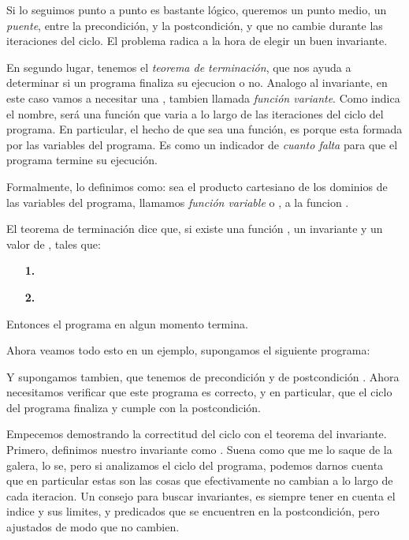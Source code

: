 \documentclass{article}
\begin{document}
Si lo seguimos punto a punto es bastante lógico, queremos un punto medio, un \textit{puente}, entre la precondición, y la postcondición, y que no cambie durante las iteraciones del ciclo. El problema radica a la hora de elegir un buen invariante.

En segundo lugar, tenemos el \textit{teorema de terminación}, que nos ayuda a determinar si un programa finaliza su ejecucion o no. Analogo al invariante, en este caso vamos a necesitar una , tambien llamada \textit{función variante}. Como indica el nombre, será una función que varia a lo largo de las iteraciones del ciclo del programa. En particular, el hecho de que sea una función, es porque esta formada por las variables del programa. Es como un indicador de \textit{cuanto falta} para que el programa termine su ejecución.

Formalmente, lo definimos como: sea  el producto cartesiano de los dominios de las variables del programa, llamamos \textit{función variable} o , a la funcion .

El teorema de terminación dice que, si existe una función , un invariante  y  un valor de , tales que:

\begin{itemize}
	\item[\textbf{1.}] 
	\item[\textbf{2.}] 
\end{itemize}

Entonces el programa en algun momento termina.

Ahora veamos todo esto en un ejemplo, supongamos el siguiente programa:





Y supongamos tambien, que tenemos de precondición  y de postcondición . Ahora necesitamos verificar que este programa es correcto, y en particular, que el ciclo del programa finaliza y cumple con la postcondición.

Empecemos demostrando la correctitud del ciclo con el teorema del invariante. Primero, definimos nuestro invariante como . Suena como que me lo saque de la galera, lo se, pero si analizamos el ciclo del programa, podemos darnos cuenta que en particular estas son las cosas que efectivamente no cambian a lo largo de cada iteracion. Un consejo para buscar invariantes, es siempre tener en cuenta el indice y sus limites, y predicados que se encuentren en la postcondición, pero ajustados de modo que no cambien.
\end{document}
